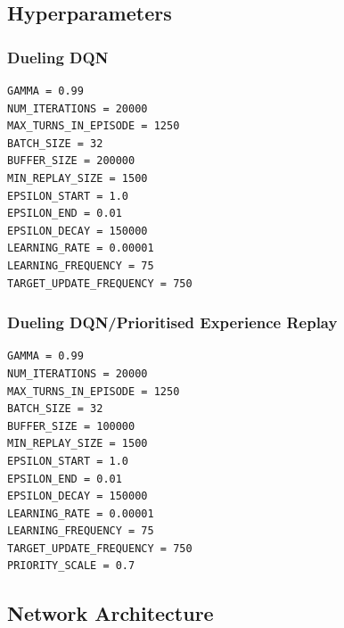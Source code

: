 \documentclass[12pt,a4paper]{article}
\begin{document}
    \subsection{Hyperparameters}\label{subsec:hyperparameters}
    \subsubsection{Dueling DQN}
    \begin{lstlisting}[label={lst:ddqnhyperparameters}]
GAMMA = 0.99
NUM_ITERATIONS = 20000
MAX_TURNS_IN_EPISODE = 1250
BATCH_SIZE = 32
BUFFER_SIZE = 200000
MIN_REPLAY_SIZE = 1500
EPSILON_START = 1.0
EPSILON_END = 0.01
EPSILON_DECAY = 150000
LEARNING_RATE = 0.00001
LEARNING_FREQUENCY = 75
TARGET_UPDATE_FREQUENCY = 750
    \end{lstlisting}

    \subsubsection{Dueling DQN/Prioritised Experience Replay}
    \begin{lstlisting}[label={lst:ddqnperhyperparameters}]
GAMMA = 0.99
NUM_ITERATIONS = 20000
MAX_TURNS_IN_EPISODE = 1250
BATCH_SIZE = 32
BUFFER_SIZE = 100000
MIN_REPLAY_SIZE = 1500
EPSILON_START = 1.0
EPSILON_END = 0.01
EPSILON_DECAY = 150000
LEARNING_RATE = 0.00001
LEARNING_FREQUENCY = 75
TARGET_UPDATE_FREQUENCY = 750
PRIORITY_SCALE = 0.7
    \end{lstlisting}


    \subsection{Network Architecture}\label{subsec:network-architecture}
\end{document}
